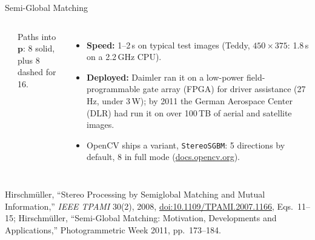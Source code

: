 \begin{frame}{Semi-Global Matching}
\begin{columns}[T,onlytextwidth]
\\[0.2em]
      {\scriptsize Paths into $\mathbf{p}$: 8 solid, plus 8 dashed for 16.\par}
      \vspace{0.2em}
      \begin{itemize}\scriptsize\itemsep0.1em
        \item \textbf{Speed:} 1--2\,s on typical test images (Teddy, $450{\times}375$: 1.8\,s on a 2.2\,GHz CPU).
        \item \textbf{Deployed:} Daimler ran it on a low-power field-programmable gate array (FPGA) for driver assistance (27\,Hz, under 3\,W); by 2011 the German Aerospace Center (DLR) had run it on over 100\,TB of aerial and satellite images.
        \item OpenCV ships a variant, \texttt{StereoSGBM}: 5 directions by default, 8 in full mode (\href{https://docs.opencv.org/4.x/d2/d85/classcv_1_1StereoSGBM.html}{docs.opencv.org}).
      \end{itemize}
  \end{columns}
  \vspace{0.1em}
  {\scriptsize Hirschm\"uller, ``Stereo Processing by Semiglobal Matching and Mutual Information,'' \textit{IEEE TPAMI} 30(2), 2008, \href{https://doi.org/10.1109/TPAMI.2007.1166}{doi:10.1109/TPAMI.2007.1166}, Eqs.~11--15; Hirschm\"uller, ``Semi-Global Matching: Motivation, Developments and Applications,'' Photogrammetric Week 2011, pp.~173--184.\par}
\end{frame}

